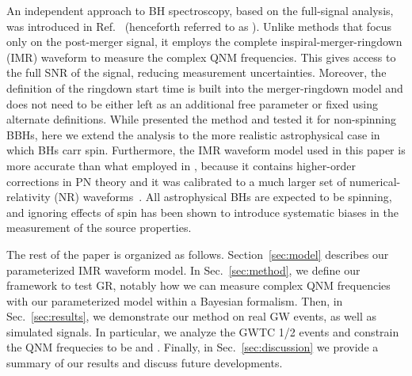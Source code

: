 An independent approach to BH spectroscopy, based on the full-signal
analysis, was introduced in Ref.~\cite{Brito:2018rfr}
(henceforth referred to as \paperone). Unlike methods that focus only
on the post-merger signal, it employs the
complete inspiral-merger-ringdown
(IMR) waveform to measure the complex QNM
frequencies. This gives access to the full SNR of the signal,
reducing measurement uncertainties. Moreover, the definition of the
ringdown start time is built into the merger-ringdown model and does not need to be
either left as an additional free parameter or fixed using alternate
definitions. While \paperone presented the method and tested it for non-spinning BBHs, here we extend the analysis to the more
realistic astrophysical case in which BHs carr spin. Furthermore,
the IMR waveform model used in this paper is more accurate than what employed in \paperone,
because it contains higher-order corrections in PN theory and it was calibrated to a much larger set
of numerical-relativity (NR) waveforms~\cite{Bohe:2016gbl}. All astrophysical BHs are expected to be spinning,
and ignoring effects of spin has been shown to introduce systematic biases in the measurement of the
source properties.

The rest of the paper is organized as follows. Section~\ref{sec:model} describes our parameterized IMR
waveform model. In Sec.~\ref{sec:method}, we define our framework to test GR, notably how we can measure
complex QNM frequencies with our parameterized model within a Bayesian formalism. Then, in Sec.~\ref{sec:results},
we demonstrate our method on real GW events, as well as simulated signals. In particular, we analyze
the GWTC 1/2  events and constrain the QNM frequecies to be  and . Finally, in Sec.~\ref{sec:discussion} we provide a summary of
our results and discuss future developments.

